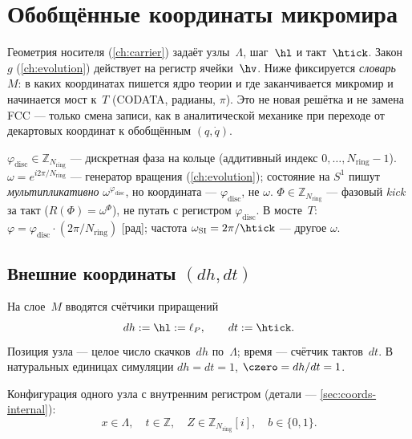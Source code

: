 \chapter{Обобщённые координаты микромира}
\label{ch:native-coords}

Геометрия носителя (\cref{ch:carrier}) задаёт узлы~$\Lambda$, шаг~$\hl$ и такт~$\htick$.
Закон~$g$ (\cref{ch:evolution}) действует на регистр ячейки~$\hv$.
Ниже фиксируется \emph{словарь}~$M$: в каких координатах пишется ядро теории
и где заканчивается микромир и начинается мост к~$T$ (CODATA, радианы, $\pi$).
Это не новая решётка и не замена FCC --- только смена записи, как в аналитической механике
при переходе от декартовых координат к обобщённым $(q,\dot q)$.

\begin{remark}
\label{rem:phi-omega-Phi}
\textbf{$\varphi_{\mathrm{disc}}\in\mathbb{Z}_{N_{\mathrm{ring}}}$} --- дискретная фаза на кольце (аддитивный индекс $0,\ldots,N_{\mathrm{ring}}-1$).
\textbf{$\omega=e^{i2\pi/N_{\mathrm{ring}}}$} --- генератор вращения (\cref{ch:evolution}); состояние на $S^1$ пишут \emph{мультипликативно} $\omega^{\varphi_{\mathrm{disc}}}$, но координата --- $\varphi_{\mathrm{disc}}$, не $\omega$.
\textbf{$\Phi\in\mathbb{Z}_{N_{\mathrm{ring}}}$} --- фазовый \emph{kick} за такт ($R(\Phi)=\omega^{\Phi}$), не путать с регистром $\varphi_{\mathrm{disc}}$.
В мосте~$T$: $\varphi=\varphi_{\mathrm{disc}}\cdot(2\pi/N_{\mathrm{ring}})$ [рад]; частота $\omega_{\mathrm{SI}}=2\pi/\htick$ --- другое $\omega$.
\end{remark}

\section{Внешние координаты \texorpdfstring{$(dh,dt)$}{(dh,dt)}}
\label{sec:coords-dh-dt}

\begin{definition}
\label{def:dh-dt}
На слое~$M$ вводятся счётчики приращений
\[
  dh := \hl := \ell_P,
  \qquad
  dt := \htick.
\]
Позиция узла --- целое число скачков~$dh$ по~$\Lambda$;
время --- счётчик тактов~$dt$.
В натуральных единицах симуляции $dh=dt=1$, $\czero=dh/dt=1$.
\end{definition}

Конфигурация одного узла с внутренним регистром (детали --- \cref{sec:coords-internal}):
\[
  x\in\Lambda,\quad t\in\mathbb{Z},\quad
  Z\in\mathbb{Z}_{N_{\mathrm{ring}}}[i],\quad
  b\in\{0,1\}.
\]


